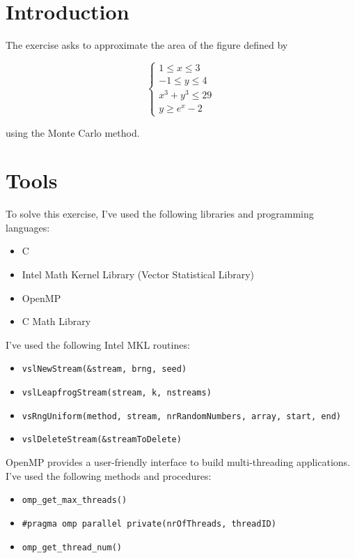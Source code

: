 \documentclass{article}
\newcommand{\code}{\texttt}
\begin{document}
\section{Introduction}\label{sec:intro}
The exercise asks to approximate the area of the figure defined by

$$
\begin{cases}
1 \le x \le 3 \\
-1\le y \le 4 \\  
x^3+y^3\le 29 \\
y \ge e^x -2
\end{cases}$$

using the Monte Carlo method.

\section{Tools}
To solve this exercise, I've used the following libraries and programming languages:

\begin{itemize}
  \item C
  \item Intel Math Kernel Library (Vector Statistical Library)
  \item OpenMP
  \item C Math Library
\end{itemize}

I've used the following Intel MKL routines:
\begin{itemize}
  \item \code{vslNewStream(\&stream, brng, seed)}
  \item \code{vslLeapfrogStream(stream, k, nstreams)}
  \item \code{vsRngUniform(method, stream, nrRandomNumbers, array, start, end)}
  \item \code{vslDeleteStream(\&streamToDelete)}
\end{itemize}

OpenMP provides a user-friendly interface to build multi-threading applications. I've used the following methods and procedures:
\begin{itemize}
  \item \code{omp\_get\_max\_threads()}
  \item \code{\#pragma omp parallel private(nrOfThreads, threadID)}
  \item \code{omp\_get\_thread\_num()}
\end{itemize}
\end{document}
